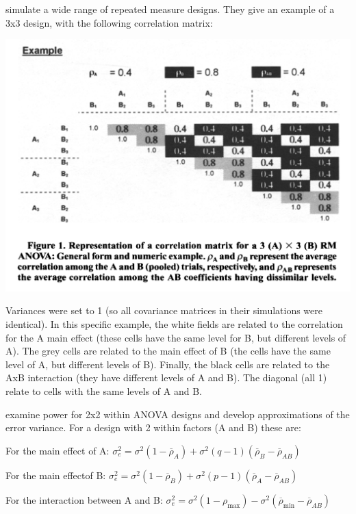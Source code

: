 \documentclass[
]{book}
\begin{document}
\citet{potvin2000statistical} simulate a wide range of repeated measure designs. They give an example of a 3x3 design, with the following correlation matrix:

\includegraphics{screenshots/PS2000.png}

Variances were set to 1 (so all covariance matrices in their simulations were identical). In this specific example, the white fields are related to the correlation for the A main effect (these cells have the same level for B, but different levels of A). The grey cells are related to the main effect of B (the cells have the same level of A, but different levels of B). Finally, the black cells are related to the AxB interaction (they have different levels of A and B). The diagonal (all 1) relate to cells with the same levels of A and B.

\citet{potvin2000statistical} examine power for 2x2 within ANOVA designs and develop approximations of the error variance. For a design with 2 within factors (A and B) these are:

For the main effect of A:
\(\sigma _ { e } ^ { 2 } = \sigma ^ { 2 } ( 1 - \overline { \rho } _ { A } ) + \sigma ^ { 2 } ( q - 1 ) ( \overline { \rho } _ { B } - \overline { \rho } _ { AB } )\)

For the main effectof B:
\(\sigma _ { e } ^ { 2 } = \sigma ^ { 2 } ( 1 - \overline { \rho } _ { B } ) + \sigma ^ { 2 } ( p - 1 ) ( \overline { \rho } _ { A } - \overline { \rho } _ { A B } )\)

For the interaction between A and B:
\(\sigma _ { e } ^ { 2 } = \sigma ^ { 2 } ( 1 - \rho _ { \max } ) - \sigma ^ { 2 } ( \overline { \rho } _ { \min } - \overline { \rho } _ { AB } )\)
\end{document}
